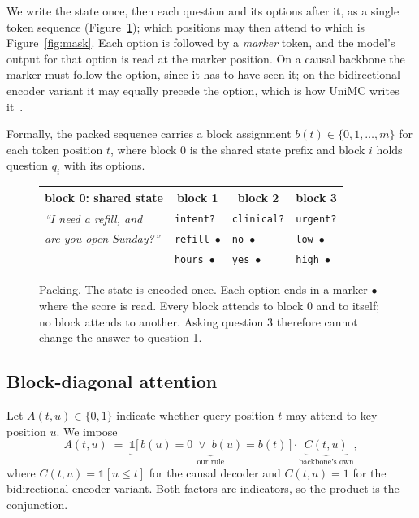 We write the state once, then each question and its options after it, as a
single token sequence (Figure~\ref{fig:packing}); which positions may
then attend to which is Figure~\ref{fig:mask}. Each option is followed by
a \emph{marker} token, and the model's output for that option is read at
the marker position. On a causal backbone the marker must follow the
option, since it has to have seen it; on the bidirectional encoder
variant it may equally precede the option, which is how UniMC writes
it~\cite{unimc}.

Formally, the packed sequence carries a block assignment $b(t) \in
\{0,1,\dots,m\}$ for each token position $t$, where block $0$ is the shared
state prefix and block $i$ holds question $q_i$ with its options.

\begin{figure}[t]
\centering
\footnotesize
\setlength{\tabcolsep}{3pt}
\begin{tabular}{|l|l|l|l|}
\hline
\multicolumn{1}{|c|}{\textbf{block 0: shared state}} &
\multicolumn{1}{c|}{\textbf{block 1}} &
\multicolumn{1}{c|}{\textbf{block 2}} &
\multicolumn{1}{c|}{\textbf{block 3}} \\
\hline
\emph{``I need a refill, and} & \texttt{intent?} & \texttt{clinical?} & \texttt{urgent?} \\
\emph{are you open Sunday?''} & \texttt{refill}~$\bullet$ & \texttt{no}~$\bullet$ & \texttt{low}~$\bullet$ \\
 & \texttt{hours}~$\bullet$ & \texttt{yes}~$\bullet$ & \texttt{high}~$\bullet$ \\
\hline
\end{tabular}
\caption{Packing. The state is encoded once. Each option ends in a marker
$\bullet$ where the score is read. Every block attends to block 0 and to
itself; no block attends to another. Asking question 3 therefore cannot
change the answer to question 1.}
\label{fig:packing}
\end{figure}

\subsection{Block-diagonal attention}

Let $A(t,u) \in \{0,1\}$ indicate whether query position $t$ may attend to
key position $u$. We impose
\begin{equation}
  A(t,u) \;=\; \underbrace{\mathbb{1}\big[\, b(u) = 0 \;\lor\; b(u) = b(t)
  \,\big]}_{\text{our rule}} \cdot \underbrace{C(t,u)}_{\text{backbone's own}},
  \label{eq:mask}
\end{equation}
where $C(t,u) = \mathbb{1}[u \le t]$ for the causal decoder and $C(t,u) =
1$ for the bidirectional encoder variant. Both factors are indicators, so
the product is the conjunction.

